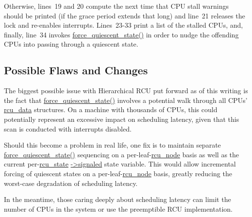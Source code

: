 Otherwise, lines~19 and 20 compute the next time that CPU stall warnings
should be printed (if the grace period extends that long) and
line~21 releases the lock and re-enables interrupts.
Lines~23-33 print a list of the stalled CPUs, and, finally,
line~34 invokes \url{force_quiescent_state()} in order to nudge the
offending CPUs into passing through a quiescent state.

\subsection{Possible Flaws and Changes}
\label{app:rcuimpl:rcutreewt:Possible Flaws and Changes}

The biggest possible issue with Hierarchical RCU put forward as of this
writing is the fact that \url{force_quiescent_state()} involves a
potential walk through all CPUs' \url{rcu_data} structures.
On a machine with thousands of CPUs, this could potentially represent
an excessive impact on scheduling latency, given that this scan is
conducted with interrupts disabled.

Should this become a problem in real life, one fix is to maintain
separate \url{force_quiescent_state()} sequencing on a
per-leaf-\url{rcu_node} basis as well as the current per-\url{rcu_state}
\url{->signaled} state variable.
This would allow incremental forcing of quiescent states on a
per-leaf-\url{rcu_node} basis, greatly reducing the worst-case degradation
of scheduling latency.

In the meantime, those caring deeply about scheduling latency can
limit the number of CPUs in the system or use the preemptible RCU
implementation.
